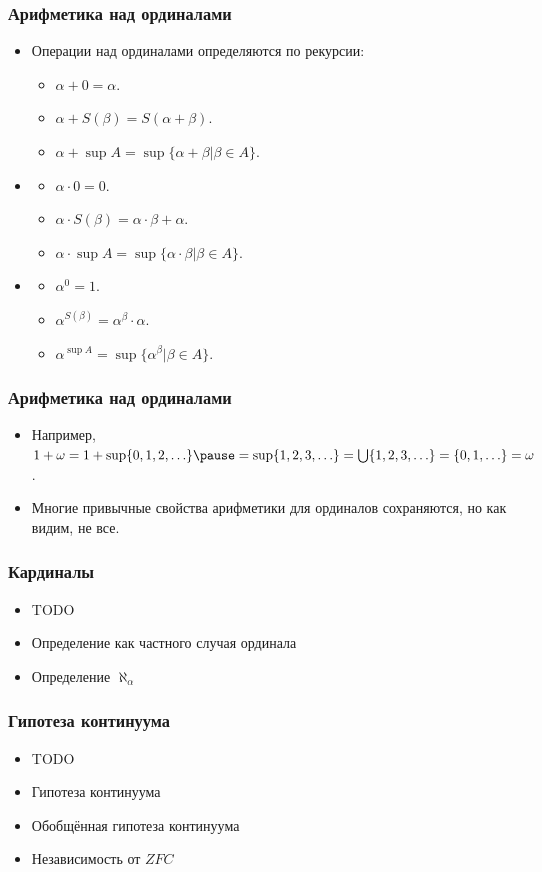 \documentclass[10pt]{beamer}
\begin{document}
\begin{frame}
    \frametitle{Арифметика над ординалами}
    \begin{itemize}
        \item Операции над ординалами определяются по рекурсии:
        \begin{itemize}
            \item $\alpha + 0 = \alpha$.
            \item $\alpha + S(\beta) = S(\alpha + \beta)$.
            \item $\alpha + \sup A = \sup \{\alpha + \beta | \beta \in A\}$.
        \end{itemize}
        \item
        \begin{itemize}
            \item $\alpha \cdot 0 = 0$.
            \item $\alpha \cdot S(\beta) = \alpha \cdot \beta + \alpha$.
            \item $\alpha \cdot \sup A = \sup \{\alpha \cdot \beta | \beta \in A\}$.
        \end{itemize}
        \item
        \begin{itemize}
            \item $\alpha^0 = 1$.
            \item $\alpha^{S(\beta)} = \alpha^\beta \cdot \alpha$.
            \item $\alpha^{\sup A} = \sup \{\alpha^\beta | \beta \in A\}$.
        \end{itemize}
    \end{itemize}
\end{frame}

\begin{frame}
    \frametitle{Арифметика над ординалами}
    \begin{itemize}
        \item Например, $1 + \omega = 1 + \sup \{0, 1, 2, \ldots\} \pause = \sup \{1, 2, 3, \ldots\} = \bigcup \{1, 2, 3, \ldots\} = \{0, 1, \ldots\} = \omega$.
        \item Многие привычные свойства арифметики для ординалов сохраняются, но как видим, не все.
    \end{itemize}
\end{frame}

\begin{frame}
    \frametitle{Кардиналы}
    \begin{itemize}
        \item TODO
        \item Определение как частного случая ординала
        \item Определение $\aleph_\alpha$
    \end{itemize}
\end{frame}

\begin{frame}
    \frametitle{Гипотеза континуума}
    \begin{itemize}
        \item TODO
        \item Гипотеза континуума
        \item Обобщённая гипотеза континуума
        \item Независимость от $ZFC$
    \end{itemize}
\end{frame}
\end{document}
